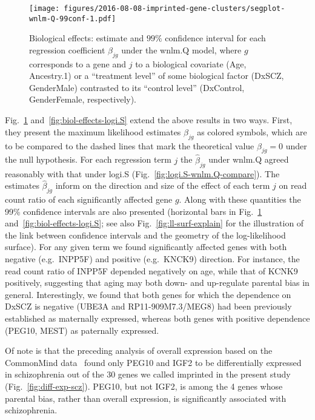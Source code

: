 \documentclass[letterpaper]{article}
\begin{document}
\begin{figure}
\begin{center}
\texttt{[image: figures/2016-08-08-imprinted-gene-clusters/segplot-wnlm-Q-99conf-1.pdf]}
\end{center}
\caption{Biological effects: estimate and $99\%$ confidence interval for each
regression coefficient \(\beta_{jg}\) under the wnlm.Q model, where \(g\)
corresponds to a gene and \(j\) to a biological covariate (Age, Ancestry.1) or
a ``treatment level'' of some biological factor (DxSCZ, GenderMale) contrasted
to its ``control level'' (DxControl, GenderFemale, respectively).}
\label{fig:biol-effects-wnlm.Q}
\end{figure}

Fig.~\ref{fig:biol-effects-wnlm.Q} and~\ref{fig:biol-effects-logi.S} extend
the above results in two ways. First, they present the maximum likelihood
estimates \(\hat\beta_{jg}\) as colored symbols, which are to be compared to
the dashed lines that mark the theoretical value \(\beta_{jg} = 0\) under
the null hypothesis.  For each regression term \(j\) the \(\hat\beta_{jg}\)
under wnlm.Q agreed reasonably with that under logi.S
(Fig.~\ref{fig:logi.S-wnlm.Q-compare}).  The estimates \(\hat\beta_{jg}\)
inform on the direction and size of the effect of each term \(j\) on read
count ratio of each significantly affected gene \(g\).  Along with these
quantities the 99\% confidence intervals are also presented (horizontal bars
in Fig.~\ref{fig:biol-effects-wnlm.Q} and~\ref{fig:biol-effects-logi.S}; see
also Fig.~\ref{fig:ll-surf-explain} for the illustration of the link between
confidence intervals and the geometry of the log-likelihood surface). For any
given term we found significantly affected genes with both negative
(e.g.~INPP5F) and positive (e.g.~KNCK9) direction.  For instance, the read
count ratio of INPP5F depended negatively on age, while that of KCNK9
positively, suggesting that aging may both down- and up-regulate parental
bias in general. Interestingly, we found that both genes for which the dependence on
DxSCZ is negative (UBE3A and RP11-909M7.3/MEG8) had been previously
established as maternally expressed, whereas both genes with positive
dependence (PEG10, MEST) as paternally expressed.

Of note is that the preceding analysis of overall expression based on the
CommonMind data~\cite{Fromer2016a} found only PEG10 and IGF2 to be
differentially expressed in schizophrenia out of the 30 genes we called
imprinted in the present study (Fig.~\ref{fig:diff-exp-scz}). PEG10, but not
IGF2, is among the 4 genes whose parental bias, rather than overall
expression, is significantly associated with schizophrenia.
\end{document}

